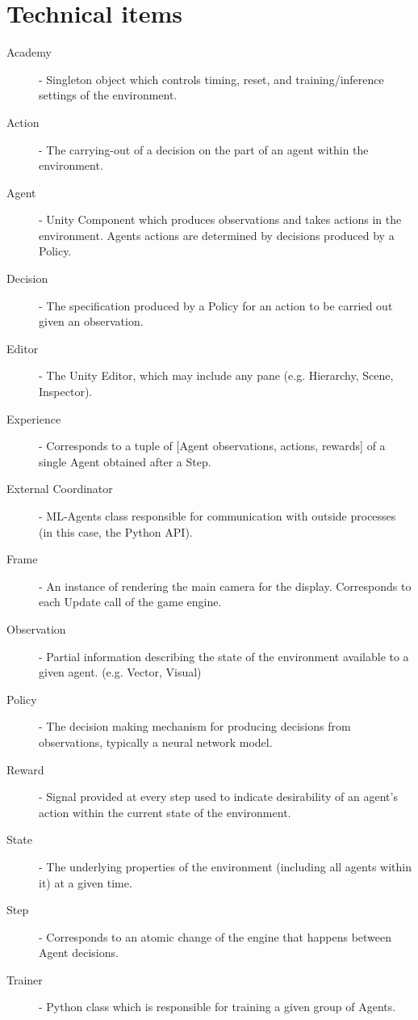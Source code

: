 \section{Technical items}
\begin{description}
    \item[Academy] - Singleton object which controls timing, reset, and training/inference settings of the environment.
    \item[Action] - The carrying-out of a decision on the part of an agent within the environment.
    \item[Agent] - Unity Component which produces observations and takes actions in the environment. Agents actions are determined by decisions produced by a Policy.
    \item[Decision] - The specification produced by a Policy for an action to be carried out given an observation.
    \item[Editor] - The Unity Editor, which may include any pane (e.g. Hierarchy, Scene, Inspector).
    \item[Experience] - Corresponds to a tuple of [Agent observations, actions, rewards] of a single Agent obtained after a Step.
    \item[External Coordinator] - ML-Agents class responsible for communication with outside processes (in this case, the Python API).
    \item[Frame] - An instance of rendering the main camera for the display. Corresponds to each Update call of the game engine.
    \item[Observation] - Partial information describing the state of the environment available to a given agent. (e.g. Vector, Visual)
    \item[Policy] - The decision making mechanism for producing decisions from observations, typically a neural network model.
    \item[Reward] - Signal provided at every step used to indicate desirability of an agent’s action within the current state of the environment.
    \item[State] - The underlying properties of the environment (including all agents within it) at a given time.
    \item[Step] - Corresponds to an atomic change of the engine that happens between Agent decisions.
    \item[Trainer] - Python class which is responsible for training a given group of Agents.  \cite{MLAgents_glossary}

\end{description}
